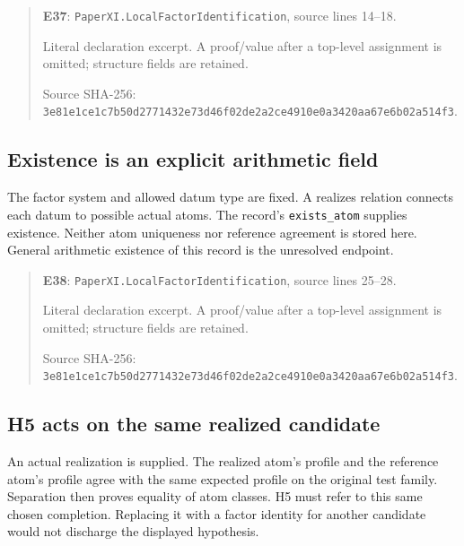 \documentclass[10pt,oneside]{book}
\begin{document}
\begin{quote}\footnotesize\textbf{E37}: \nolinkurl{PaperXI.LocalFactorIdentification}, source lines 14--18.\par Literal declaration excerpt. A proof/value after a top-level assignment is omitted; structure fields are retained.\par Source SHA-256: {\scriptsize\texttt{3e81e1ce1c7b50d2771432e73d46f02de2a2ce4910e0a3420aa67e6b02a514f3}}.\end{quote}


\subsection{Existence is an explicit arithmetic field}
\label{guide:E38}
The factor system and allowed datum type are fixed. A realizes relation connects each datum to possible actual atoms.
The record's \texttt{exists\_atom} supplies existence. Neither atom uniqueness nor reference agreement is stored here. General arithmetic existence of this record is the unresolved endpoint.

\begin{quote}\footnotesize\textbf{E38}: \nolinkurl{PaperXI.LocalFactorIdentification}, source lines 25--28.\par Literal declaration excerpt. A proof/value after a top-level assignment is omitted; structure fields are retained.\par Source SHA-256: {\scriptsize\texttt{3e81e1ce1c7b50d2771432e73d46f02de2a2ce4910e0a3420aa67e6b02a514f3}}.\end{quote}


\subsection{H5 acts on the same realized candidate}
\label{guide:E39}
An actual realization is supplied. The realized atom's profile and the reference atom's profile agree with the same expected profile on the original test family.
Separation then proves equality of atom classes. H5 must refer to this same chosen completion. Replacing it with a factor identity for another candidate would not discharge the displayed hypothesis.
\end{document}

